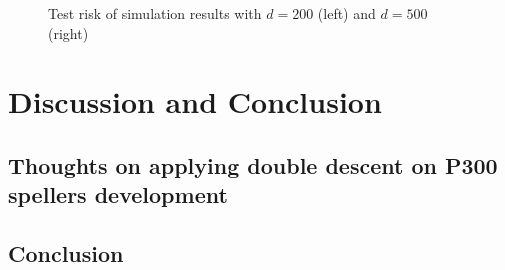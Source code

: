 \documentclass{article}
\begin{document}
\begin{figure}[H]
	\centering
	\qquad
	\hspace{-8mm}
	\caption{Test risk of simulation results with $d=200$ (left) and $d=500$ (right)}
	\label{fig:2}
\end{figure}


\section{Discussion and Conclusion} \label{Conclusion}
\subsection{Thoughts on applying double descent on P300 spellers development}


\subsection{Conclusion}	




\end{document}
